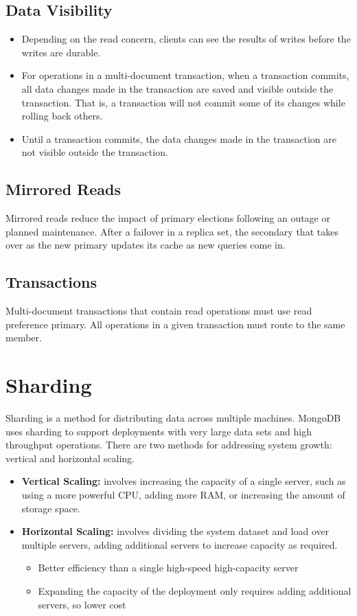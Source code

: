\subsection{Data Visibility}
\begin{itemize}
    \item Depending on the read concern, clients can see the results of writes before the writes are durable.
    \item For operations in a multi-document transaction, when a transaction commits, all data changes made in the transaction are saved and visible outside the transaction. That is, a transaction will not commit some of its changes while rolling back others.
    \item Until a transaction commits, the data changes made in the transaction are not visible outside the transaction.
\end{itemize}

\subsection{Mirrored Reads}
Mirrored reads reduce the impact of primary elections following an outage or planned maintenance. After a failover in a replica set, the secondary that takes over as the new primary updates its cache as new queries come in.

\subsection{Transactions}
Multi-document transactions that contain read operations must use read preference primary. All operations in a given transaction must route to the same member.

\section{Sharding}
Sharding is a method for distributing data across multiple machines. MongoDB uses sharding to support deployments with very large data sets and high throughput operations. There are two methods for addressing system growth: vertical and horizontal scaling.
\begin{itemize}
    \item \textbf{Vertical Scaling:} involves increasing the capacity of a single server, such as using a more powerful CPU, adding more RAM, or increasing the amount of storage space.
    \item \textbf{Horizontal Scaling:} involves dividing the system dataset and load over multiple servers, adding additional servers to increase capacity as required.
    \begin{itemize}
        \item Better efficiency than a single high-speed high-capacity server
        \item Expanding the capacity of the deployment only requires adding additional servers, so lower cost
    \end{itemize}
\end{itemize}

